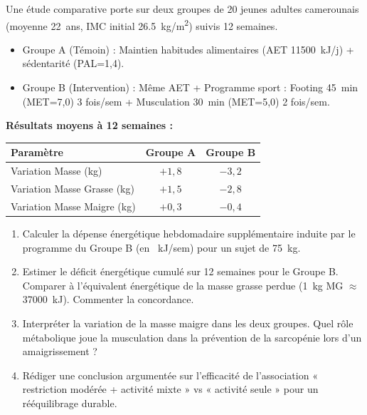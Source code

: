 \documentclass[11pt]{article}
\begin{document}
\begin{exercice}
Une étude comparative porte sur deux groupes de 20 jeunes adultes camerounais (moyenne \SI{22}{ans}, IMC initial \SI{26,5}{kg/m^2}) suivis 12 semaines.
\begin{itemize}
    \item Groupe A (Témoin) : Maintien habitudes alimentaires (AET \SI{11500}{kJ/j}) + sédentarité (PAL=1,4).
    \item Groupe B (Intervention) : Même AET + Programme sport : Footing \SI{45}{min} (MET=7,0) 3 fois/sem + Musculation \SI{30}{min} (MET=5,0) 2 fois/sem.
\end{itemize}
\textbf{Résultats moyens à 12 semaines :}
\begin{tabular}{lcc}
\hline
Paramètre & Groupe A & Groupe B \\
\hline
Variation Masse (kg) & $+1,8$ & $-3,2$ \\
Variation Masse Grasse (kg) & $+1,5$ & $-2,8$ \\
Variation Masse Maigre (kg) & $+0,3$ & $-0,4$ \\
\hline
\end{tabular}
\begin{enumerate}
    \item Calculer la dépense énergétique hebdomadaire supplémentaire induite par le programme du Groupe B (en \SI{}{kJ/sem}) pour un sujet de \SI{75}{kg}.
    \item Estimer le déficit énergétique cumulé sur 12 semaines pour le Groupe B. Comparer à l'équivalent énergétique de la masse grasse perdue (\SI{1}{kg} MG $\approx$ \SI{37000}{kJ}). Commenter la concordance.
    \item Interpréter la variation de la masse maigre dans les deux groupes. Quel rôle métabolique joue la musculation dans la prévention de la sarcopénie lors d'un amaigrissement ?
    \item Rédiger une conclusion argumentée sur l'efficacité de l'association « restriction modérée + activité mixte » vs « activité seule » pour un rééquilibrage durable.
\end{enumerate}
\end{exercice}
\end{document}

